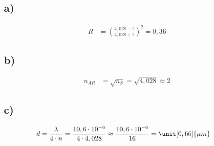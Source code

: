\subsection*{a)}

\begin{align*}
R &= \left( \frac{4,028 - 1}{4,028 + 1} \right)^2 = 0,36
\end{align*}

\subsection*{b)}

\begin{align*}
n_{AR} &= \sqrt{n_S} = \sqrt{4,028} \approx 2
\end{align*}

\subsection*{c)}

\begin{align*}
d &= \frac{\lambda}{4 \cdot n} = \frac{10,6 \cdot 10^{-6}}{4 \cdot 4,028} \approx \frac{10,6 \cdot 10^{-6}}{16} = \unit[0,66]{\mu m}
\end{align*}






